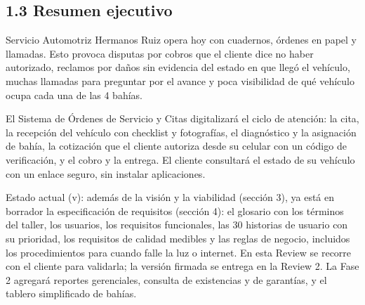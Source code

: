 \subsection{1.3 Resumen ejecutivo}\label{resumen-ejecutivo}

Servicio Automotriz Hermanos Ruiz opera hoy con cuadernos, órdenes en
papel y llamadas. Esto provoca disputas por cobros que el cliente dice
no haber autorizado, reclamos por daños sin evidencia del estado en que
llegó el vehículo, muchas llamadas para preguntar por el avance y poca
visibilidad de qué vehículo ocupa cada una de las 4 bahías.

El Sistema de Órdenes de Servicio y Citas digitalizará el ciclo de
atención: la cita, la recepción del vehículo con checklist y
fotografías, el diagnóstico y la asignación de bahía, la cotización que
el cliente autoriza desde su celular con un código de verificación, y el
cobro y la entrega. El cliente consultará el estado de su vehículo con un
enlace seguro, sin instalar aplicaciones.

Estado actual (v\versiondoc): además de la visión y la viabilidad
(sección 3), ya está en borrador la especificación de requisitos
(sección 4): el glosario con los términos del taller, los usuarios, los
requisitos funcionales, las 30 historias de usuario con su prioridad, los
requisitos de calidad medibles y las reglas de negocio, incluidos los
procedimientos para cuando falle la luz o internet. En esta Review se
recorre con el cliente para validarla; la versión firmada se entrega en
la Review 2. La Fase 2 agregará reportes gerenciales, consulta de
existencias y de garantías, y el tablero simplificado de bahías.
